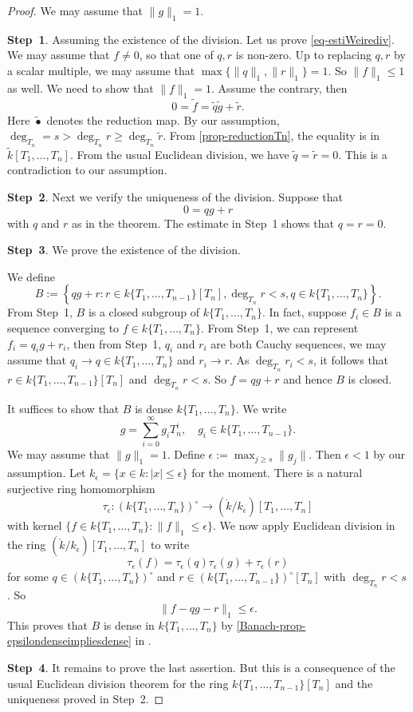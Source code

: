 \begin{proof}
    We may assume that $\|g\|_1=1$.

    \textbf{Step~1}. Assuming the existence of the division. Let us prove \eqref{eq-estiWeirediv}. We may assume that $f\neq 0$, so that one of $q,r$ is non-zero. Up to replacing $q,r$ by a scalar multiple, we may assume that $\max\{\|q\|_1,\|r\|_1\}=1$. So $\|f\|_1\leq 1$ as well. We need to show that $\|f\|_1= 1$. Assume the contrary, then 
    \[
        0=\tilde{f} =\tilde{q}\tilde{g}+\tilde{r}. 
    \]
    Here $\tilde{\bullet}$ denotes the reduction map. By our assumption, $\deg_{T_n}=s>\deg_{T_n}r\geq \deg_{T_n}\tilde{r}$. From  \cref{prop-reductionTn}, the equality is in $\tilde{k}[T_1,\ldots,T_n]$. From the usual Euclidean division, we have $\tilde{q}=\tilde{r}=0$. This is a contradiction to our assumption.

    \textbf{Step~2}. Next we verify the uniqueness of the division. Suppose that 
    \[
        0=qg+r  
    \]
    with $q$ and $r$ as in the theorem. The estimate in Step~1 shows that $q=r=0$.

    \textbf{Step~3}. We prove the existence of the division.

    We define
    \[
        B:=\left\{qg+r:r\in k\{T_1,\ldots,T_{n-1}\}[T_n], \deg_{T_n}r<s,q\in k\{T_1,\ldots,T_{n}\}\right\}.
    \]
    From Step~1, $B$ is a closed subgroup of $k\{T_1,\ldots,T_{n}\}$. In fact, suppose $f_i\in B$ is a sequence converging to $f\in k\{T_1,\ldots,T_{n}\}$. From Step~1, we can represent $f_i=q_ig+r_i$, then from Step~1, $q_i$ and $r_i$ are both Cauchy sequences, we may assume that $q_i\to q\in k\{T_1,\ldots,T_{n}\}$ and $r_i\to r$. As $\deg_{T_n}r_i<s$, it follows that $r\in k\{T_1,\ldots,T_{n-1}\}[T_n]$ and $\deg_{T_n}r<s$. So $f=qg+r$ and hence $B$ is closed.

    It suffices to show that $B$ is dense $k\{T_1,\ldots,T_{n}\}$. We write 
    \[
      g=\sum_{i=0}^{\infty}g_i T_n^{i},\quad g_i\in k\{T_1,\ldots,T_{n-1}\}.  
    \]
    We may assume that $\|g\|_1=1$.
    Define $\epsilon:=\max_{j\geq s} \|g_j\|$. Then $\epsilon<1$ by our assumption. Let $k_{\epsilon}=\{x\in k:|x|\leq \epsilon\}$ for the moment. There is a natural surjective ring homomorphism 
    \[
        \tau_{\epsilon}:(k\{T_1,\ldots,T_n\} )^{\circ}\rightarrow (\mathring{k}/k_{\epsilon})[T_1,\ldots,T_n]
    \] 
    with kernel $\{f\in k\{T_1,\ldots,T_n\}  : \|f\|_1\leq \epsilon\}$.  We now apply Euclidean division in the ring $(\mathring{k}/k_{\epsilon})[T_1,\ldots,T_n]$ to write
    \[
        \tau_{\epsilon}(f)=\tau_{\epsilon}(q)\tau_{\epsilon}(g)+\tau_{\epsilon}(r)
    \]
    for some $q\in (k\{T_1,\ldots,T_n\} )^{\circ}$ and $r\in (k\{T_1,\ldots,T_{n-1}\} )^{\circ}[T_n]$ with $\deg_{T_n}r<s$. So
    \[
        \|f-qg-r\|_1\leq \epsilon.  
    \]
    This proves that $B$ is dense in $k\{T_1,\ldots,T_{n}\}$ by \cref{Banach-prop-epsilondenseimpliesdense} in .

    \textbf{Step~4}. It remains to prove the last assertion. But this is a consequence of the usual Euclidean division theorem for the ring $k\{T_1,\ldots,T_{n-1}\}[T_n]$ and the uniqueness proved in Step~2.
\end{proof}
